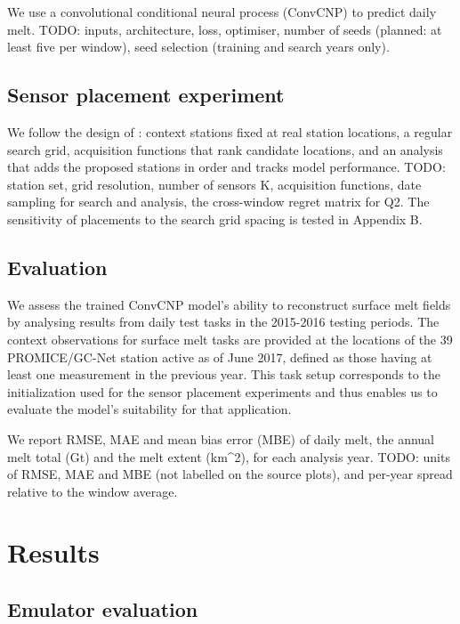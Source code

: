 \documentclass[tc, manuscript]{copernicus}
\begin{document}
We use a convolutional conditional neural process (ConvCNP)
\citep{gordon2020} to predict daily melt. TODO: inputs, architecture,
loss, optimiser, number of seeds (planned: at least five per window),
seed selection (training and search years only).

\subsection{Sensor placement
experiment}\label{sensor-placement-experiment}

We follow the design of \citet{andersson2023}: context stations fixed at
real station locations, a regular search grid, acquisition functions
that rank candidate locations, and an analysis that adds the proposed
stations in order and tracks model performance. TODO: station set, grid
resolution, number of sensors K, acquisition functions, date sampling
for search and analysis, the cross-window regret matrix for Q2. The
sensitivity of placements to the search grid spacing is tested in
Appendix B.

\subsection{Evaluation}\label{evaluation}

We assess the trained ConvCNP model's ability to reconstruct surface
melt fields by analysing results from daily test tasks in the 2015-2016
testing periods. The context observations for surface melt tasks are
provided at the locations of the 39 PROMICE/GC-Net station active as of
June 2017, defined as those having at least one measurement in the
previous year. This task setup corresponds to the initialization used
for the sensor placement experiments and thus enables us to evaluate the
model's suitability for that application.

We report RMSE, MAE and mean bias error (MBE) of daily melt, the annual
melt total (Gt) and the melt extent (km\^{}2), for each analysis year.
TODO: units of RMSE, MAE and MBE (not labelled on the source plots), and
per-year spread relative to the window average.

\section{Results}\label{results}

\subsection{Emulator evaluation}\label{emulator-evaluation}
\end{document}
